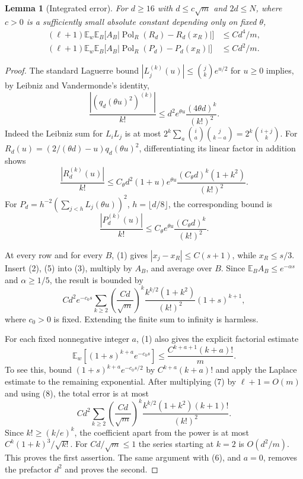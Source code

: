 \documentclass[11pt]{article}
\newtheorem{lemma}{Lemma}
\newcommand{\E}{\mathbb E}
\begin{document}
\begin{lemma}[Integrated error]
For $d\ge16$ with $d\le c\sqrt m$ and $2d\le N$, where $c>0$ is a
sufficiently small absolute constant depending only on fixed $\theta$,
\begin{align*}
 (\ell+1)\E_w\E_B\bigl[A_B
   |\operatorname{Pol}_R(R_d)-R_d(x_R)|\bigr]&\le C d^4/m,\\
 (\ell+1)\E_w\E_B\bigl[A_B
   |\operatorname{Pol}_R(P_d)-P_d(x_R)|\bigr]&\le C d^2/m.
\end{align*}
\end{lemma}
\begin{proof}
The standard Laguerre bound
$|L_j^{(k)}(u)|\le\binom jk e^{u/2}$ for $u\ge0$ implies, by Leibniz
and Vandermonde's identity,
\[
 \frac{|(q_d(\theta u)^2)^{(k)}|}{k!}
 \le d^2 e^{\theta u}\frac{(4\theta d)^k}{(k!)^2}.
\tag{4}
\]
Indeed the Leibniz sum for $L_iL_j$ is at most
$2^k\sum_a\binom ia\binom j{k-a}=2^k\binom{i+j}k$.
For $R_d(u)=(2/(\theta d)-u)q_d(\theta u)^2$, differentiating its
linear factor in addition shows
\[
 \frac{|R_d^{(k)}(u)|}{k!}
 \le C_\theta d^2(1+u)e^{\theta u}
       \frac{(C_\theta d)^k(1+k^2)}{(k!)^2}.
\tag{5}
\]
For $P_d=h^{-2}(\sum_{j<h}L_j(\theta u))^2$, $h=\lfloor d/8\rfloor$,
the corresponding bound is
\[
 \frac{|P_d^{(k)}(u)|}{k!}
 \le C_\theta e^{\theta u}\frac{(C_\theta d)^k}{(k!)^2}.
\tag{6}
\]

At every row and for every $B$, (1) gives
$|x_j-x_R|\le C(s+1)$, while $x_R\le s/3$.
Insert (2), (5) into (3), multiply by $A_B$, and average over $B$.
Since $\E_B A_B\le e^{-\alpha s}$ and $\alpha\ge1/5$, the result
is bounded by
\[
 C d^2 e^{-c_0s}\sum_{k\ge2}
  \left(\frac{Cd}{\sqrt m}\right)^k
  \frac{k^{k/2}(1+k^2)}{(k!)^2}(1+s)^{k+1},
\tag{7}
\]
where $c_0>0$ is fixed. Extending the finite sum to infinity is harmless.

For each fixed nonnegative integer $a$, (1) also gives the explicit
factorial estimate
\[
 \E_w[(1+s)^{k+a}e^{-c_0s}]
 \le\frac{C^{k+a+1}(k+a)!}{m}.
\tag{8}
\]
To see this, bound $(1+s)^{k+a}e^{-c_0s/2}$ by
$C^{k+a}(k+a)!$ and apply the Laplace estimate to the remaining
exponential.
After multiplying (7) by $\ell+1=O(m)$ and using (8), the total error
is at most
\[
 C d^2\sum_{k\ge2}
   \left(\frac{Cd}{\sqrt m}\right)^k
   \frac{k^{k/2}(1+k^2)(k+1)!}{(k!)^2}.
\]
Since $k!\ge(k/e)^k$, the coefficient apart from the power is at
most $C^k(1+k)^3/\sqrt{k!}$. For $Cd/\sqrt m\le1$ the series
starting at $k=2$ is $O(d^2/m)$. This proves the first assertion.
The same argument with (6), and $a=0$, removes the prefactor $d^2$
and proves the second.
\end{proof}
\end{document}
